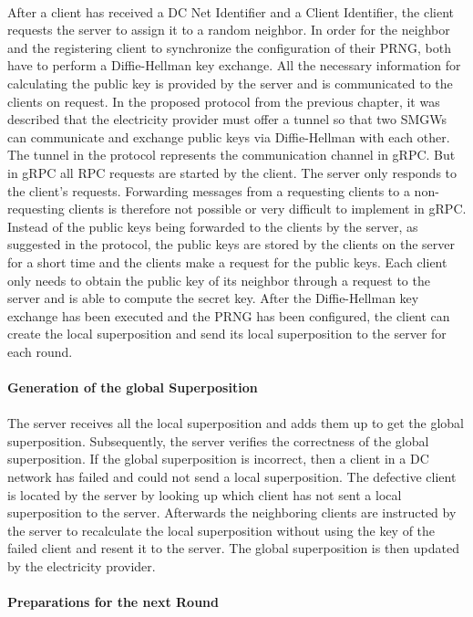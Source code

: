 \\
After a client has received a DC Net Identifier and a Client Identifier, the client requests the server to assign it to a random neighbor. In order for the neighbor and the registering client to synchronize the configuration of their \gls{PRNG}, both have to perform a Diffie-Hellman key exchange. All the necessary information for calculating the public key is provided by the server and is communicated to the clients on request. In the proposed protocol from the previous chapter, it was described that the electricity provider must offer a tunnel so that two \gls{SMGW}s can communicate and exchange public keys via Diffie-Hellman with each other. The tunnel in the protocol represents the communication channel in gRPC. But in gRPC all \gls{RPC} requests are started by the client. The server only responds to the client's requests. Forwarding messages from a requesting clients to a non-requesting clients is therefore not possible or very difficult to implement in gRPC. Instead of the public keys being forwarded to the clients by the server, as suggested in the protocol, the public keys are stored by the clients on the server for a short time and the clients make a request for the public keys. 
Each client only needs to obtain the public key of its neighbor through a request to the server and is able to compute the secret key. After the Diffie-Hellman key exchange has been executed and the \gls{PRNG} has been configured, the client can create the local superposition and send its local superposition to the server for each round. 
\\
\\
\textbf{Generation of the global Superposition}
\\
\\
The server receives all the local superposition and adds them up to get the global superposition. Subsequently, the server verifies the correctness of the global superposition. If the global superposition is incorrect, then a client in a DC network has failed and could not send a local superposition. The defective client is located by the server by looking up which client has not sent a local superposition to the server. Afterwards the neighboring clients are instructed by the server to recalculate the local superposition without using the key of the failed client and resent it to the server. The global superposition is then updated by the electricity provider. \pagebreak
\\
\\
\textbf{Preparations for the next Round}
